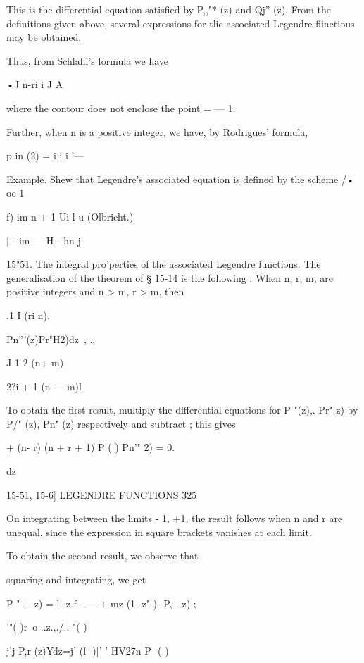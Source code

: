 {{{This is the differential equation satisfied by P,,"* (z) and Qj'' (z).
From the definitions given above, several expressions for tlie
associated Legendre fiinctious may be obtained.

Thus, from Schlafli's formula we have

•J n-ri i J A

where the contour does not enclose the point = — 1.

Further, when n is a positive integer, we have, by Rodrigues' formula,

p in (2) = i i i '—

Example. Shew that Legendre's associated equation is defined by the
scheme /• oc 1

f) im n + 1 Ui l-u (Olbricht.)

[ - im — H - hn j

15"51. The integral pro'perties of the associated Legendre functions.
The generalisation of the theorem of § 15-14 is the following : When
n, r, m, are positive integers and n > m, r > m, then



.1 I (ri n),

Pn'''(z)Pr"H2)dz\ , .,

J 1 2 (n+ m)\



2?i + 1 (n — m)l

To obtain the first result, multiply the differential equations for P
"(z),. Pr" z) by P/" (z), Pn" (z) respectively and subtract ; this
gives

+ (n- r) (n + r + 1) P ( ) Pn'" 2) = 0.



dz



15-51, 15-6] LEGENDRE FUNCTIONS 325

On integrating between the limits - 1, +1, the result follows when n
and r are unequal, since the expression in square brackets vanishes at
each limit.

To obtain the second result, we observe that



squaring and integrating, we get



P " + z) = l- z-f - — + mz (1 -z"-)- P, - z) ;



  '"( )r\ o-..z.,./.. "( )



j'j P,r (z)Ydz=j' (l- )|' ' HV27n P -( )



}}}
